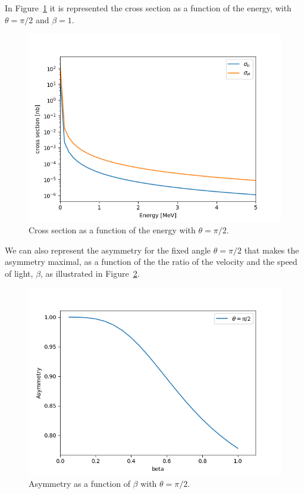 \documentclass[10pt,swedish, openany]{book}
\begin{document}
In Figure~\ref{fig:energy} it is represented the cross section as a function of the energy, with $\theta=\pi/2$ and $\beta=1$.

\begin{figure}[H]
\includegraphics[scale=0.5]{energy.png}
\centering
\caption{Cross section as a function of the energy with $\theta=\pi/2$.}
\label{fig:energy}
\end{figure}

We can also represent the asymmetry for the fixed angle $\theta=\pi/2$ that makes the asymmetry maximal, as a function of the the ratio of the velocity and the speed of light, $\beta$, as illustrated in Figure~\ref{fig:asymmetry}.

\begin{figure}[H]
\includegraphics[scale=0.5]{asym.png}
\centering
\caption{Asymmetry as a function of $\beta$ with $\theta=\pi/2$.}
\label{fig:asymmetry}
\end{figure}
\end{document}
